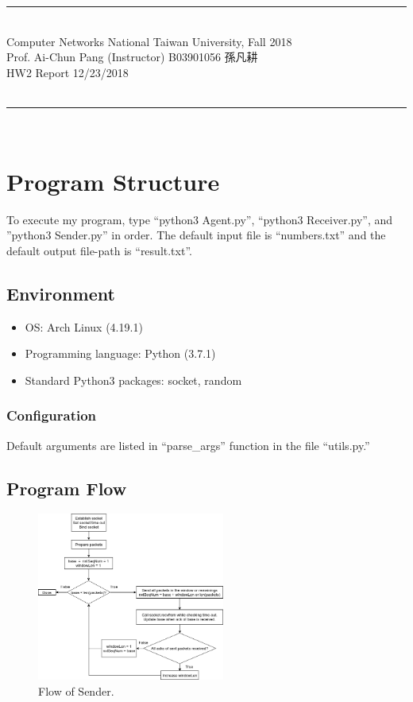 \documentclass{article}
\begin{document}
{\bf \noindent
\rule[3pt]{\textwidth}{0.3pt}\\
Computer Networks \hfill National Taiwan University, Fall 2018 \\
Prof. Ai-Chun Pang (Instructor) \hfill B03901056 孫凡耕 \\
HW2 Report \hfill 12/23/2018 \\
\vspace{-14pt} \\
\rule[3pt]{\textwidth}{1.3pt}\\
[-1cm]
}


\section{Program Structure}

To execute my program, type ``python3 Agent.py'', ``python3 Receiver.py'', and ''python3 Sender.py'' in order.
The default input file is ``numbers.txt'' and the default output file-path is ``result.txt''.

\subsection{Environment}
\begin{itemize}
  \item OS: Arch Linux (4.19.1)
  \item Programming language: Python (3.7.1)
  \item Standard Python3 packages: socket, random
\end{itemize}

\subsubsection{Configuration}
Default arguments are listed in ``parse\_args'' function in the file ``utils.py.''

\subsection{Program Flow}
\begin{figure}[h]
 \centering
 \includegraphics[width=0.55\textwidth]{Sender.png}
 \caption{Flow of Sender.}
\end{figure}
\end{document}
